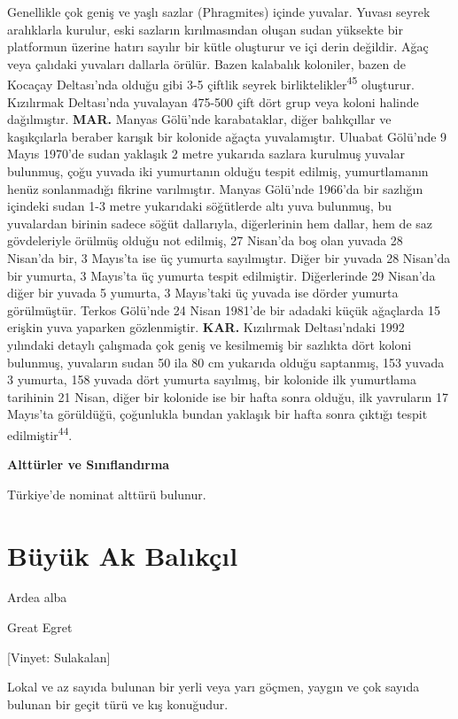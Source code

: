 \documentclass[
  letterpaper,
  DIV=11,
  numbers=noendperiod]{scrreprt}
\begin{document}
Genellikle çok geniş ve yaşlı sazlar (Phragmites) içinde yuvalar. Yuvası
seyrek aralıklarla kurulur, eski sazların kırılmasından oluşan sudan
yüksekte bir platformun üzerine hatırı sayılır bir kütle oluşturur ve
içi derin değildir. Ağaç veya çalıdaki yuvaları dallarla örülür. Bazen
kalabalık koloniler, bazen de Kocaçay Deltası'nda olduğu gibi 3-5
çiftlik seyrek birliktelikler\textsuperscript{45} oluşturur. Kızılırmak
Deltası'nda yuvalayan 475-500 çift dört grup veya koloni halinde
dağılmıştır. \textbf{MAR.} Manyas Gölü'nde karabataklar, diğer
balıkçıllar ve kaşıkçılarla beraber karışık bir kolonide ağaçta
yuvalamıştır. Uluabat Gölü'nde 9 Mayıs 1970'de sudan yaklaşık 2 metre
yukarıda sazlara kurulmuş yuvalar bulunmuş, çoğu yuvada iki yumurtanın
olduğu tespit edilmiş, yumurtlamanın henüz sonlanmadığı fikrine
varılmıştır. Manyas Gölü'nde 1966'da bir sazlığın içindeki sudan 1-3
metre yukarıdaki söğütlerde altı yuva bulunmuş, bu yuvalardan birinin
sadece söğüt dallarıyla, diğerlerinin hem dallar, hem de saz
gövdeleriyle örülmüş olduğu not edilmiş, 27 Nisan'da boş olan yuvada 28
Nisan'da bir, 3 Mayıs'ta ise üç yumurta sayılmıştır. Diğer bir yuvada 28
Nisan'da bir yumurta, 3 Mayıs'ta üç yumurta tespit edilmiştir.
Diğerlerinde 29 Nisan'da diğer bir yuvada 5 yumurta, 3 Mayıs'taki üç
yuvada ise dörder yumurta görülmüştür. Terkos Gölü'nde 24 Nisan 1981'de
bir adadaki küçük ağaçlarda 15 erişkin yuva yaparken gözlenmiştir.
\textbf{KAR.} Kızılırmak Deltası'ndaki 1992 yılındaki detaylı çalışmada
çok geniş ve kesilmemiş bir sazlıkta dört koloni bulunmuş, yuvaların
sudan 50 ila 80 cm yukarıda olduğu saptanmış, 153 yuvada 3 yumurta, 158
yuvada dört yumurta sayılmış, bir kolonide ilk yumurtlama tarihinin 21
Nisan, diğer bir kolonide ise bir hafta sonra olduğu, ilk yavruların 17
Mayıs'ta görüldüğü, çoğunlukla bundan yaklaşık bir hafta sonra çıktığı
tespit edilmiştir\textsuperscript{44}.

\textbf{Alttürler ve Sınıflandırma}

Türkiye'de nominat alttürü bulunur.

\section{Büyük Ak Balıkçıl}\label{buxfcyuxfck-ak-balux131kuxe7ux131l}

Ardea alba

Great Egret

{[}Vinyet: Sulakalan{]}

Lokal ve az sayıda bulunan bir yerli veya yarı göçmen, yaygın ve çok
sayıda bulunan bir geçit türü ve kış konuğudur.
\end{document}
